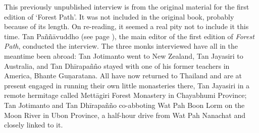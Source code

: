 This previously unpublished interview is from the original
material for the first edition of `Forest Path'. It was not included in
the original book, probably because of its length. On re-reading, it
seemed a real pity not to include it this time. Tan Paññāvuddho (see page \pageref{pannyavuddho-desc}),
the main editor of the first edition of \emph{Forest Path}, conducted the
interview. The three monks interviewed have all in the meantime been
abroad: Tan Jotimanto went to New Zealand, Tan Jayasiri to Australia, 
and Tan Dhīrapañño stayed with one of his former teachers in America, 
Bhante Guṇaratana. All have now returned to Thailand and are at present
engaged in running their own little monasteries there, Tan Jayasiri in a
remote hermitage called Mettāgiri Forest Monastery in Chayabhumi
Province; Tan Jotimanto and Tan Dhīrapañño co-abboting Wat Pah Boon Lorm
on the Moon River in Ubon Province, a half-hour drive from Wat Pah
Nanachat and closely linked to it.

